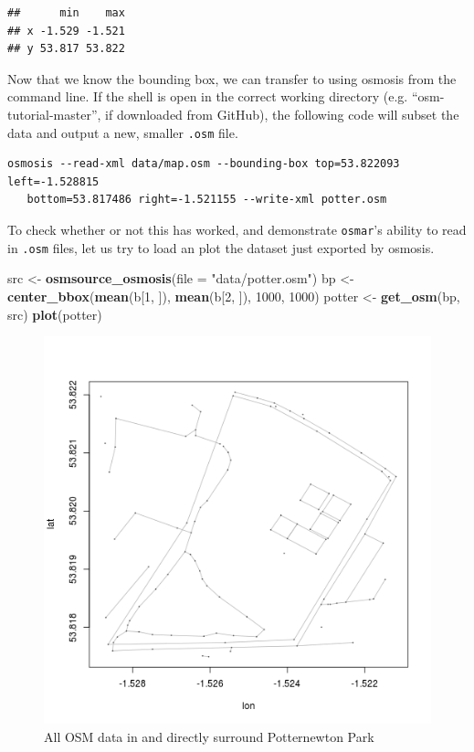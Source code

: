 \documentclass[]{article}
\newenvironment{Shaded}{}{}
\newcommand{\KeywordTok}[1]{\textcolor[rgb]{0.00,0.44,0.13}{\textbf{{#1}}}}
\newcommand{\DataTypeTok}[1]{\textcolor[rgb]{0.56,0.13,0.00}{{#1}}}
\newcommand{\DecValTok}[1]{\textcolor[rgb]{0.25,0.63,0.44}{{#1}}}
\newcommand{\StringTok}[1]{\textcolor[rgb]{0.25,0.44,0.63}{{#1}}}
\newcommand{\NormalTok}[1]{{#1}}
\begin{document}
\begin{verbatim}
##      min    max
## x -1.529 -1.521
## y 53.817 53.822
\end{verbatim}

Now that we know the bounding box, we can transfer to using osmosis from
the command line. If the shell is open in the correct working directory
(e.g. ``osm-tutorial-master'', if downloaded from GitHub), the following
code will subset the data and output a new, smaller \texttt{.osm} file.

\begin{verbatim}
osmosis --read-xml data/map.osm --bounding-box top=53.822093 left=-1.528815
   bottom=53.817486 right=-1.521155 --write-xml potter.osm
\end{verbatim}

To check whether or not this has worked, and demonstrate
\texttt{osmar}'s ability to read in \texttt{.osm} files, let us try to
load an plot the dataset just exported by osmosis.

\begin{Shaded}
\begin{Highlighting}[]
\NormalTok{src <-}\StringTok{ }\KeywordTok{osmsource_osmosis}\NormalTok{(}\DataTypeTok{file =} \StringTok{"data/potter.osm"}\NormalTok{)}
\NormalTok{bp <-}\StringTok{ }\KeywordTok{center_bbox}\NormalTok{(}\KeywordTok{mean}\NormalTok{(b[}\DecValTok{1}\NormalTok{, ]), }\KeywordTok{mean}\NormalTok{(b[}\DecValTok{2}\NormalTok{, ]), }\DecValTok{1000}\NormalTok{, }\DecValTok{1000}\NormalTok{)}
\NormalTok{potter <-}\StringTok{ }\KeywordTok{get_osm}\NormalTok{(bp, src)}
\KeywordTok{plot}\NormalTok{(potter)}
\end{Highlighting}
\end{Shaded}

\begin{figure}[htbp]
\centering
\includegraphics{figure/All_OSM_data_in_and_directly_surround_Potternewton_Park.png}
\caption{All OSM data in and directly surround
Potternewton Park}
\end{figure}
\end{document}
